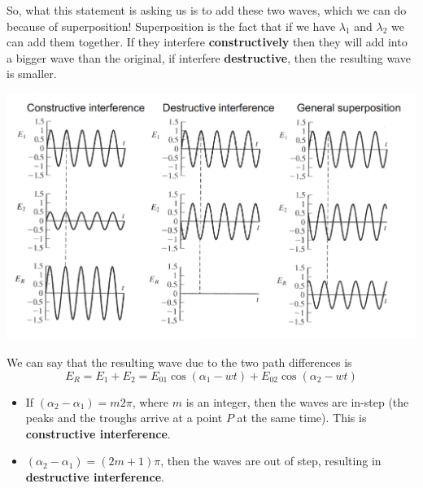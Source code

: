 \documentclass[10pt]{article}
\begin{document}
\newpage 

So, what this statement is asking us is to add these two waves, which we can do because of superposition! Superposition is the fact that if we have $\lambda_1$ and $\lambda_2$ we can add them together. If they interfere \textbf{constructively} then they will add into a bigger wave than the original, if interfere \textbf{destructive}, then the resulting wave is smaller.

\begin{center}
    \includegraphics*[scale = .5]{imgs/superposition.png}
\end{center}
We can say that the resulting wave due to the two path differences is
\[E_R = E_1 + E_2 = E_{01}\cos(\alpha_1 - wt) + E_{02}\cos(\alpha_2 - wt)\]
\begin{itemize}
    \item If $(\alpha_2 - \alpha_1) = m2\pi$, where $m$ is an integer, then the waves are in-step (the peaks and the troughs arrive at a point $P$ at the same time). This is \textbf{constructive interference}.
    \item $(\alpha_2 - \alpha_1) = (2m+1)\pi$, then the waves are out of step, resulting in \textbf{destructive interference}.
\end{itemize}
\end{document}
